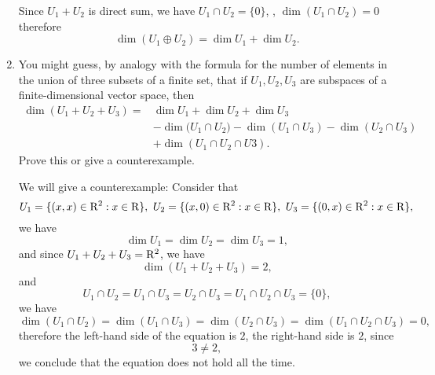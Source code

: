 \begin{enumerate}
\begin{solution}
            Since $U_1 + U_2 $ is direct sum, we have $U_1 \cap U_2 = \{0\}$, \ie, $\dim{(U_1 \cap U_2)} = 0$ therefore 
            \[ \dim{(U_1 \oplus U_2)} = \dim{U_1} + \dim{U_2}.\]
        \end{solution}
    \item You might guess, by analogy with the formula for the number of elements in the union of three subsets of a finite set, 
        that if $U_1, U_2, U_3$ are subspaces of a finite-dimensional vector space, then 
        \begin{align*}
            \dim{(U_1 + U_2 + U_3)} =& \dim{U_1} + \dim{U_2} + \dim{U_3} \\
                                   & - \dim({U_1 \cap U_2)} - \dim{(U_1 \cap U_3)} - \dim{(U_2 \cap U_3)} \\
                                   & + \dim{(U_1 \cap U_2 \cap U3)}.
        \end{align*}
        Prove this or give a counterexample.
        \begin{solution}
            We will give a counterexample:
            Consider that 
            \[ U_1=\{(x,x)\in \mathrm{R}^2:x\in \mathrm{R}\},\ U_2=\{(x,0)\in \mathrm{R}^2: x\in \mathrm{R}\}, \ U_3=\{(0,x)\in \mathrm{R}^2: x\in \mathrm{R}\},\]
            we have 
            \[ \dim{U_1} = \dim{U_2} = \dim{U_3} = 1,\]
            and since $U_1 + U_2 + U_3 = \mathrm{R}^2$, we have 
            \[ \dim{(U_1 + U_2 + U_3)} = 2,\]
            and 
            \[ U_1 \cap U_2 = U_1 \cap U_3 = U_2 \cap U_3 = U_1 \cap U_2 \cap U_3 = \{0\},\]
            we have 
            \[ \dim{(U_1\cap U_2)} = \dim{(U_1 \cap U_3)} = \dim{(U_2 \cap U_3)} = \dim{(U_1 \cap U_2 \cap U_3)} = 0,\]
            therefore the left-hand side of the equation is $2$, the right-hand side is $2$, since 
            \[ 3 \neq 2,\]
            we conclude that the equation does not hold all the time.
        \end{solution}
\end{enumerate}